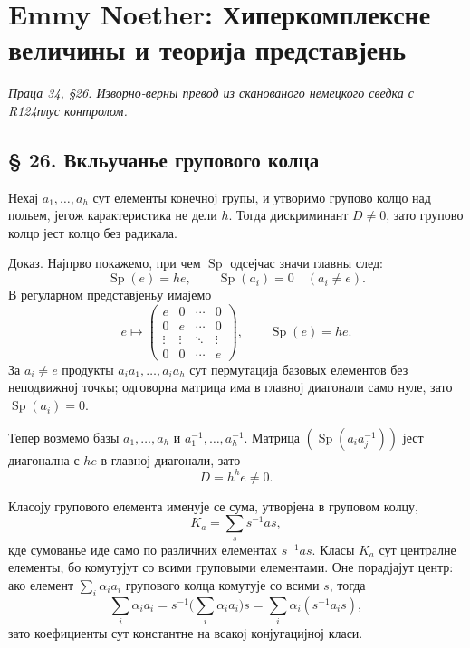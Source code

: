 ﻿\documentclass[11pt]{article}
\begin{document}
\section*{Emmy Noether: Хиперкомплексне величины и теорија представјень}
\emph{Праца 34, §26. Изворно-верны превод из сканованого немецкого сведка с R124плус контролом.}

\subsection*{§ 26. Вкльучанье групового колца}

Нехај $a_1,\ldots,a_h$ сут елементы конечној групы, и утворимо групово колцо над польем, јегож карактеристика не дели $h$. Тогда дискриминант $D\ne0$, зато групово колцо јест колцо без радикала.

Доказ. Најпрво покажемо, при чем $\operatorname{Sp}$ одсејчас значи главны след:
\[
        \operatorname{Sp}(e)=he,
        \qquad
        \operatorname{Sp}(a_i)=0\quad(a_i\ne e).
\]
В регуларном представјеньу имајемо
\[
        e\mapsto
        \begin{pmatrix}
        e&0&\cdots&0\\
        0&e&\cdots&0\\
        \vdots&\vdots&\ddots&\vdots\\
        0&0&\cdots&e
        \end{pmatrix},
        \qquad \operatorname{Sp}(e)=he.
\]
За $a_i\ne e$ продукты $a_i a_1,\ldots,a_i a_h$ сут пермутација базовых елементов без неподвижној точкы; одговорна матрица има в главној диагонали само нуле, зато $\operatorname{Sp}(a_i)=0$.

Тепер возмемо базы $a_1,\ldots,a_h$ и $a_1^{-1},\ldots,a_h^{-1}$. Матрица $(\operatorname{Sp}(a_i a_j^{-1}))$ јест диагонална с $he$ в главној диагонали, зато
\[
        D=h^h e\ne0.
\]

Класоју групового елемента именује се сума, утворјена в груповом колцу,
\[
        K_a=\sum_s s^{-1}as,                         \tag{1}
\]
кде сумованье иде само по различних елементах $s^{-1}as$. Класы $K_a$ сут централне елементы, бо комутујут со всими груповыми елементами. Оне порадјајут центр: ако елемент $\sum_i\alpha_i a_i$ групового колца комутује со всими $s$, тогда
\[
        \sum_i\alpha_i a_i=s^{-1}\biggl(\sum_i\alpha_i a_i\biggr)s
        =\sum_i\alpha_i(s^{-1}a_i s),
\]
зато коефициенты сут константне на всакој конјугацијној класи.
\end{document}
